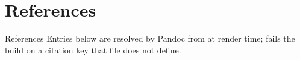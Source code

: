 \documentclass[
  ignorenonframetext,
]{beamer}
\author{\texorpdfstring{}{}}
\date{}
\begin{document}
\section{References}\label{sec:references}

\begin{frame}{References}
Entries below are resolved by Pandoc from
\href{https://github.com/ActiveInferenceInstitute/Generalized_Notation_Notation/blob/main/manuscript/references.bib}{}
at render time;  fails the
build on a citation key that file does not define.
\end{frame}
\end{document}
